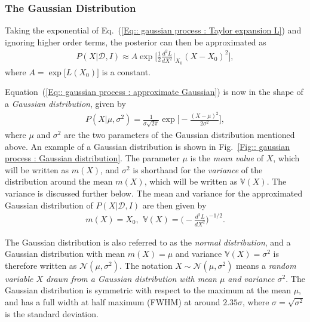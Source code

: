\documentclass[twoside,english]{uiofysmaster}
\begin{document}
\subsubsection{The Gaussian Distribution}\label{Sec:: gaussian process : The Gaussian Distribution}

Taking the exponential of Eq.~(\ref{Eq:: gaussian process : Taylor expansion L}) and ignoring higher order terms, the posterior can then be approximated as
\begin{align}\label{Eq:: gaussian process : approximate Gaussian}
P(X | \mathcal{D}, I) \approx A \exp \Bigg[ \frac{1}{2} \frac{d^2L}{dX^2}\Big|_{X_0} (X-X_0)^2 \Bigg], 
\end{align} 
where $A = \exp \big[L(X_0) \big]$ is a constant. 

Equation~(\ref{Eq:: gaussian process : approximate Gaussian}) is now in the shape of a \textit{Gaussian distribution}, given by
\begin{align}
P(X| \mu, \sigma^2) = \frac{1}{\sigma \sqrt{2 \pi}} \exp \Bigg[ - \frac{(X- \mu)^2}{2 \sigma^2} \Bigg],
\end{align}
where $\mu$ and $\sigma^2$ are the two parameters of the Gaussian distribution mentioned above. An example of a Gaussian distribution is shown in Fig.~\ref{Fig:: gaussian process : Gaussian distribution}. The parameter $\mu$ is the \textit{mean value} of $X$, which will be written as $ m(X)$, and $\sigma^2$ is shorthand for the \textit{variance} of the distribution around the mean $m(X)$, which will be written as $\mathbb{V}(X)$. The variance is discussed further below. The mean and variance for the approximated Gaussian distribution of $P(X|\mathcal{D}, I)$ are then given by
\begin{align}
m(X) = X_0\text{, }~ \mathbb{V}(X) = \Big( - \frac{d^2L}{dX^2} \Big)^{-1/2}.
\end{align}

The Gaussian distribution is also referred to as the \textit{normal distribution}, and a Gaussian distribution with mean $m(X)= \mu$ and variance $\mathbb{V}(X)=\sigma^2$ is therefore written as $\mathcal{N}(\mu, \sigma^2)$. The notation $X \sim \mathcal{N}(\mu, \sigma^2)$ means a \textit{random variable $X$ drawn from a Gaussian distribution with mean $\mu$ and variance $\sigma^2$}. The Gaussian distribution is symmetric with respect to the maximum at the mean $\mu$, and has a full width at half maximum (FWHM) at around $2.35 \sigma$, where $\sigma = \sqrt{\sigma^2}$ is the standard deviation.  
\end{document}
